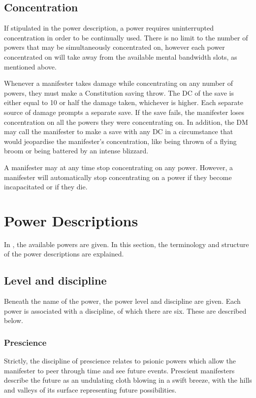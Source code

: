 \subsection{Concentration}
If stipulated in the power description,
a power requires uninterrupted concentration
in order to be continually used.
There is no limit to the number of powers that may be
simultaneously concentrated on,
however each power concentrated on will take away from the
available mental bandwidth slots, as mentioned above.

Whenever a manifester takes damage while
concentrating on any number of powers,
they must make a Constitution saving throw.
The DC of the save is either equal to 10 or half the damage taken,
whichever is higher.
Each separate source of damage prompts a separate save.
If the save fails,
the manifester loses concentration on all the powers they were
concentrating on.
In addition, the DM may call the manifester to make a
save with any DC in a circumstance that would
jeopardise the manifester's concentration,
like being thrown of a flying broom or
being battered by an intense blizzard.

A manifester may at any time stop concentrating on any power.
However, a manifester will automatically stop concentrating on a power
if they become incapacitated or if they die.

\section{Power Descriptions}
In ,
the available powers are given.
In this section,
the terminology and structure of the power descriptions are explained.

\subsection{Level and discipline}
Beneath the name of the power,
the power level and discipline are given.
Each power is associated with a discipline,
of which there are six.
These are described below.

\subsubsection{Prescience}
Strictly, the discipline of prescience relates to psionic powers
which allow the manifester to peer through time and see future events.
Prescient manifesters describe the future as
an undulating cloth blowing in a swift breeze,
with the hills and valleys of its surface representing
future possibilities. 

